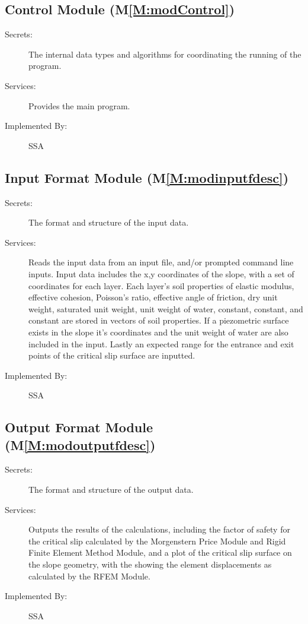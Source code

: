 \documentclass[12pt]{article}
\begin{document}
\subsection{Control Module (M\ref{M:modControl})}
\label{Sec:ContModu()}
\begin{description}
\item[Secrets:]The internal data types and algorithms for coordinating the running of the program.
\item[Services:]Provides the main program.
\item[Implemented By:]SSA
\end{description}
\subsection{Input Format Module (M\ref{M:modinputfdesc})}
\label{Sec:InpuFormModu()}
\begin{description}
\item[Secrets:]The format and structure of the input data.
\item[Services:]Reads the input data from an input file, and/or prompted command line inputs. Input data includes the x,y coordinates of the slope, with a set of coordinates for each layer. Each layer's soil properties of elastic modulus, effective cohesion, Poisson's ratio, effective angle of friction, dry unit weight, saturated unit weight, unit weight of water, constant, constant, and constant are stored in vectors of soil properties. If a piezometric surface exists in the slope it's coordinates and the unit weight of water are also included in the input. Lastly an expected range for the entrance and exit points of the critical slip surface are inputted.
\item[Implemented By:]SSA
\end{description}
\subsection{Output Format Module (M\ref{M:modoutputfdesc})}
\label{Sec:OutpFormModu()}
\begin{description}
\item[Secrets:]The format and structure of the output data.
\item[Services:]Outputs the results of the calculations, including the factor of safety for the critical slip calculated by the Morgenstern Price Module and Rigid Finite Element Method Module, and a plot of the critical slip surface on the slope geometry, with the showing the element displacements as calculated by the RFEM Module.
\item[Implemented By:]SSA
\end{description}
\end{document}
